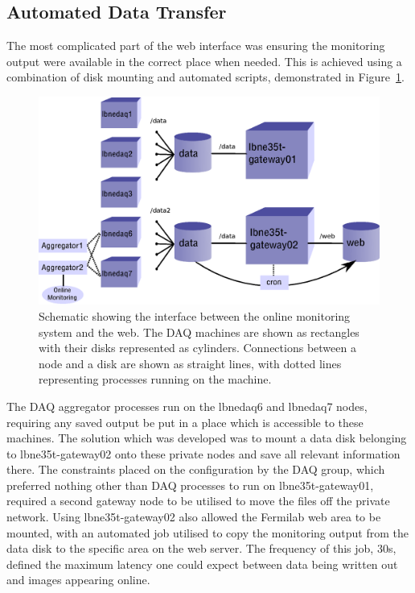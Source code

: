 \subsection{Automated Data Transfer}\label{sec:AutomatedDataTransfer}

The most complicated part of the web interface was ensuring the monitoring output were available in the correct place when needed.  This is achieved using a combination of disk mounting and automated scripts, demonstrated in Figure~\ref{fig:WebInterface}.

\begin{figure}[ht]
  \centering
  \includegraphics[width=12cm]{webInterface.eps}
  \caption[Schematic showing the interface between the online monitoring system and the web]{Schematic showing the interface between the online monitoring system and the web.  The DAQ machines are shown as rectangles with their disks represented as cylinders.  Connections between a node and a disk are shown as straight lines, with dotted lines representing processes running on the machine.}
  \label{fig:WebInterface}
\end{figure}

The DAQ aggregator processes run on the lbnedaq6 and lbnedaq7 nodes, requiring any saved output be put in a place which is accessible to these machines.  The solution which was developed was to mount a data disk belonging to lbne35t-gateway02 onto these private nodes and save all relevant information there.  The constraints placed on the configuration by the DAQ group, which preferred nothing other than DAQ processes to run on lbne35t-gateway01, required a second gateway node to be utilised to move the files off the private network.  Using lbne35t-gateway02 also allowed the Fermilab web area to be mounted, with an automated job utilised to copy the monitoring output from the data disk to the specific area on the web server.  The frequency of this job, 30s, defined the maximum latency one could expect between data being written out and images appearing online.

